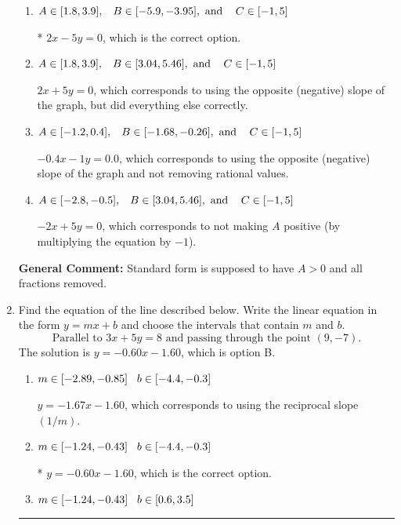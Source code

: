 \documentclass{extbook}[14pt]
\newcommand{\litem}[1]{\item #1

\rule{\textwidth}{0.4pt}}
\begin{document}
\begin{enumerate}
{\begin{enumerate}[label=\Alph*.]
 $-0.4x + 1y = -0.0$, which corresponds to not removing rational values for Standard Form.
\item \( A \in [1.8, 3.9], \hspace{3mm} B \in [-5.9, -3.95], \text{ and } \hspace{3mm} C \in [-1, 5] \)

* $2x - 5y = 0$, which is the correct option.
\item \( A \in [1.8, 3.9], \hspace{3mm} B \in [3.04, 5.46], \text{ and } \hspace{3mm} C \in [-1, 5] \)

 $2x + 5y = 0$, which corresponds to using the opposite (negative) slope of the graph, but did everything else correctly.
\item \( A \in [-1.2, 0.4], \hspace{3mm} B \in [-1.68, -0.26], \text{ and } \hspace{3mm} C \in [-1, 5] \)

 $-0.4x - 1y = 0.0$, which corresponds to using the opposite (negative) slope of the graph and not removing rational values.
\item \( A \in [-2.8, -0.5], \hspace{3mm} B \in [3.04, 5.46], \text{ and } \hspace{3mm} C \in [-1, 5] \)

 $-2x + 5y = 0$, which corresponds to not making $A$ positive (by multiplying the equation by $-1$).
\end{enumerate}

\textbf{General Comment:} Standard form is supposed to have $A > 0$ and all fractions removed.
}
\litem{
Find the equation of the line described below. Write the linear equation in the form $ y=mx+b $ and choose the intervals that contain $m$ and $b$.
\[ \text{Parallel to } 3 x + 5 y = 8 \text{ and passing through the point } (9, -7). \]The solution is \( y = -0.60x - 1.60 \), which is option B.\begin{enumerate}[label=\Alph*.]
\item \( m \in [-2.89, -0.85] \hspace*{3mm} b \in [-4.4, -0.3] \)

 $y = -1.67x - 1.60$, which corresponds to using the reciprocal slope $(1/m)$.
\item \( m \in [-1.24, -0.43] \hspace*{3mm} b \in [-4.4, -0.3] \)

* $y = -0.60x - 1.60$, which is the correct option.
\item \( m \in [-1.24, -0.43] \hspace*{3mm} b \in [0.6, 3.5] \)


\end{enumerate}}
\end{enumerate}
\end{document}
